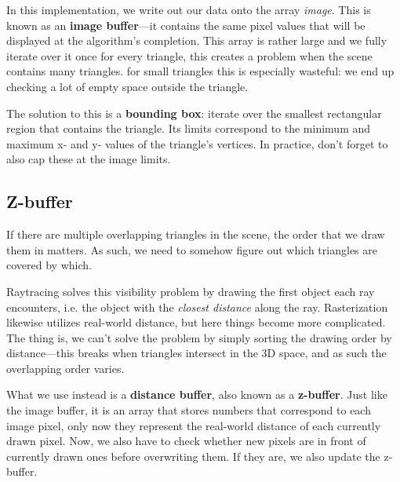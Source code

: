\documentclass{article}
\begin{document}
In this implementation, we write out our data onto the array \textit{image}.
This is known as an \textbf{image buffer}—it contains the same pixel values that will be displayed at the algorithm's completion.
This array is rather large and we fully iterate over it once for every triangle, this creates a problem when the scene contains many triangles.
for small triangles this is especially wasteful: we end up checking a lot of empty space outside the triangle.

The solution to this is a \textbf{bounding box}: iterate over the smallest rectangular region that contains the triangle.
Its limits correspond to the minimum and maximum x- and y- values of the triangle's vertices.
In practice, don't forget to also cap these at the image limits.

\subsection{Z-buffer}

If there are multiple overlapping triangles in the scene, the order that we draw them in matters.
As such, we need to somehow figure out which triangles are covered by which.

Raytracing solves this visibility problem by drawing the first object each ray encounters, i.e. the object with the \textit{closest distance} along the ray.
Rasterization likewise utilizes real-world distance, but here things become more complicated.
The thing is, we can't solve the problem by simply sorting the drawing order by distance—this breaks when triangles intersect in the 3D space, and as such the overlapping order varies.

What we use instead is a \textbf{distance buffer}, also known as a \textbf{z-buffer}.
Just like the image buffer, it is an array that stores numbers that correspond to each image pixel, only now they represent the real-world distance of each currently drawn pixel.
Now, we also have to check whether new pixels are in front of currently drawn ones before overwriting them.
If they are, we also update the z-buffer.
\end{document}
